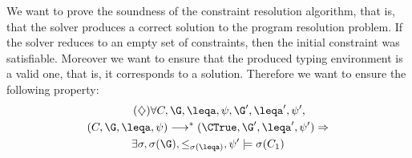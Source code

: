 \label{ssec:verification}

We want to prove the soundness of the constraint resolution algorithm, that is, that the solver produces a correct solution to the program resolution problem. If the solver reduces to an empty set of constraints, then the initial constraint was satisfiable. Moreover we want to ensure that the produced typing environment is a valid one, that is, it corresponds to a solution. Therefore we want to ensure the following property:\vspace*{-2mm}
\begin{multline}\tag{$\diamondsuit$}\label{eq:solvsound}
  \forall C,\G,\leqa,\psi, \G', \leqa', \psi',\\
  (C,\G,\leqa,\psi) \longrightarrow^* (\CTrue,\G',\leqa',\psi') \Rightarrow\\
  \exists \sigma, \sigma(\G),\leq_{\sigma(\leqa)},\psi' \models \sigma(C_1)\vspace*{-2mm}
\end{multline}  
